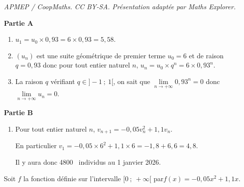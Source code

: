 \documentclass[10pt]{article}
\providecommand{\np}[2][]{{#2~#1}}
\providecommand{\ds}{\displaystyle}
\begin{document}
\noindent\textit{APMEP / CoopMaths. CC BY-SA. Présentation adaptée par Maths Explorer.}\par\medskip
\medskip

\textbf{Partie A}

\begin{enumerate}
	\item $u_1= u_0\times 0,93= 6 \times 0,93 = 5,58$.
	\item $(u_n)$ est une suite géométrique de premier terme $u_0 = 6$ et de raison $q=0,93$ donc pour tout entier naturel $n$,\: $u_n =u_0\times q^n=6\times 0,93^n$.
	\item La raison $q$ vérifiant $q \in ]-1~;~1[$, on sait que $\ds \lim\limits_{n \to +\infty} 0,93^n = 0$ donc $\ds \lim\limits_{n \to +\infty} u_n = 0$.
\end{enumerate}

\medskip

\textbf{Partie B}

\medskip

\begin{enumerate}
\item Pour tout entier naturel $n$, $v_{n+1} = -0,05v_n^2+1,1v_n$.

En particulier $v_1= - 0,05\times 6^2+ 1,1\times 6 = - 1,8 + 6,6 = 4,8$.
	
Il y aura donc \np{4800} individus au 1 janvier 2026.
\end{enumerate}

Soit $f$ la fonction définie sur l'intervalle $[0~;~+\infty[$ par$f(x) = -0,05x^2 + 1,1x$.
\end{document}
